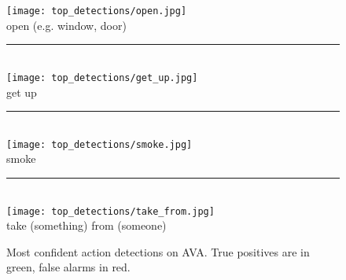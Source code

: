\documentclass[10pt,twocolumn,letterpaper]{article}
\begin{document}
\begin{figure*}[t]
\centering
\texttt{[image: top\_detections/open.jpg]}
\\
open (e.g. window, door)
\\
\noindent\rule{.85\textwidth}{1pt}\\[1em]
\texttt{[image: top\_detections/get\_up.jpg]}
\\
get up
\\
\noindent\rule{.85\textwidth}{1pt}\\[1em]
\texttt{[image: top\_detections/smoke.jpg]}
\\
smoke
\\
\noindent\rule{.85\textwidth}{1pt}\\[1em]
\texttt{[image: top\_detections/take\_from.jpg]}
\\
take (something) from (someone)
\\
\caption{Most confident action detections on AVA. True positives are in green, false alarms in red.}
\label{fig:top_det2}
\end{figure*}

%
 
\end{document}

